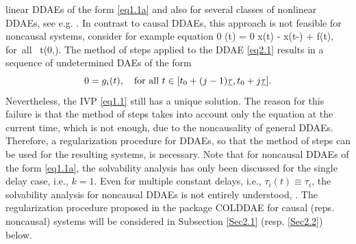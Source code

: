 \documentclass[final,reqno]{siamltex}
\begin{document}
linear DDAEs of the form \eqref{eq1.1a} and also for several classes of nonlinear DDAEs, see e.g. \cite{AscP95,BakPT02,GugH07,Hau97,ShaG06}.
In contrast to causal DDAEs, this approach is not feasible for noncausal systems,
consider for example equation 
%
\be\label{eq2.1}
  0 \cdot {}(t) = 0 \cdot x(t) - x(t-\tau) + f(t), \quad \mbox{for all } t\in (0,\infty).
\ee
%
The method of steps applied to the DDAE \eqref{eq2.1} results in a sequence of undetermined DAEs of the form
%
\[
 0 = g_i(t), \quad \mbox{for all } t \in [t_0+(j-1)\underline{\tau},t_0+j\underline{\tau}]. 
\]
%
Nevertheless, the IVP \eqref{eq1.1} still has a unique solution. 
The reason for this failure is that the method of steps takes into account only the equation at the current time, which is not enough, 
due to the noncausality of general DDAEs. Therefore, a regularization procedure for DDAEs, so that the method of steps can be used for the resulting systems, is 
necessary. Note that for noncausal DDAEs of the form \eqref{eq1.1a}, the solvability analysis has only been discussed for 
the single delay case, i.e., $k=1$. Even for multiple constant delays, i.e., $\tau_i(t) \equiv \tau_i$, the solvability analysis for noncausal DDAEs 
is not entirely understood, \cite{HaM14,Ha15}. 
The regularization procedure proposed in the package COLDDAE for causal (reps. noncausal) systems will be considered in Subsection \ref{Sec2.1} (resp. \ref{Sec2.2}) below.
\end{document}
